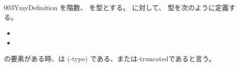 \documentclass[index]{subfiles}
\begin{document}
\begin{myBlock}{003Y}{myDefinition}
  を階数、
  を型とする。
  に対して、
  型を次のように定義する。
  \begin{itemize}
  \item {}
  \item {}
  \end{itemize}
  の要素がある時、は
  (-type)
  である、または-truncatedであると言う。
\end{myBlock}
\end{document}
